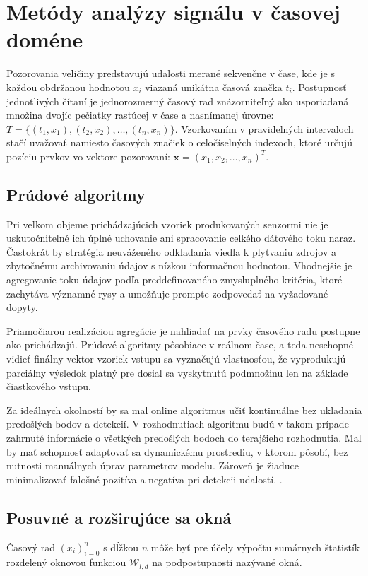 \section{Metódy analýzy signálu v časovej doméne}
Pozorovania veličiny predstavujú udalosti merané sekvenčne v čase, kde je s každou obdržanou hodnotou $x_i$ viazaná unikátna
časová značka $t_i$. Postupnosť jednotlivých čítaní je jednorozmerný časový rad znázorniteľný ako usporiadaná množina dvojíc pečiatky
rastúcej v čase a nasnímanej úrovne: $T = \{(t_1, x_1),(t_2, x_2), …, (t_n, x_n)\}$. Vzorkovaním v pravidelných intervaloch stačí
uvažovať namiesto časových značiek o celočíselných indexoch, ktoré určujú pozíciu prvkov vo vektore pozorovaní:
$\mathbf{x} = (x_1, x_2, …, x_n)^T$.

\subsection{Prúdové algoritmy}
Pri veľkom objeme prichádzajúcich vzoriek produkovaných senzormi nie je uskutočniteľné ich úplné uchovanie ani spracovanie celkého
dátového toku naraz. Častokrát by stratégia neuváženého odkladania viedla k plytvaniu zdrojov a zbytočnému archivovaniu
údajov s nízkou informačnou hodnotou. Vhodnejšie je agregovanie toku údajov podľa preddefinovaného zmysluplného kritéria, 
ktoré zachytáva významné rysy a umožňuje prompte zodpovedať na vyžadované dopyty.

Priamočiarou realizáciou agregácie je nahliadať na prvky časového radu postupne ako prichádzajú.
Prúdové algoritmy pôsobiace v reálnom čase, a teda neschopné vidieť finálny vektor vzoriek vstupu sa vyznačujú vlastnosťou, 
že vyprodukujú parciálny výsledok platný pre dosiaľ sa vyskytnutú podmnožinu len na základe čiastkového vstupu.

Za ideálnych okolností by sa mal online algoritmus učiť kontinuálne bez ukladania predošlých bodov a detekcií.
V rozhodnutiach algoritmu budú v takom prípade zahrnuté informácie o všetkých predošlých bodoch do terajšieho rozhodnutia.
Mal by mať schopnosť adaptovať sa dynamickému prostrediu, v ktorom pôsobí, bez nutnosti manuálnych úprav parametrov modelu.
Zároveň je žiaduce minimalizovať falošné pozitíva a negatíva pri detekcii udalostí. \cite{data-streams}.

\subsection{Posuvné a rozširujúce sa okná}
Časový rad $\left(x_i\right)_{i = 0}^{n}$ s dĺžkou $n$ môže byť pre účely výpočtu sumárnych štatistík rozdelený oknovou funkciou
$\mathcal{W}_{l, d}$ na podpostupnosti nazývané okná.

